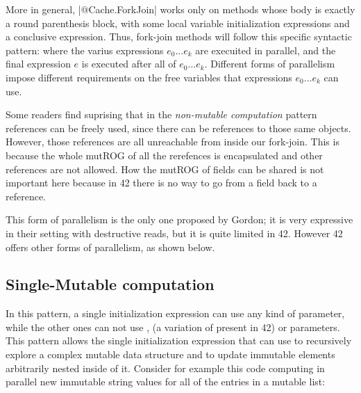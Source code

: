More in general, \Q|$@$Cache.ForkJoin| works only on methods whose body is exactly a round parenthesis block, with some local variable initialization expressions and a conclusive expression.
Thus, fork-join methods will follow this specific syntactic pattern:
where the varius expressions $e_0...e_k$ are execuited in parallel, and the final expression $e$ is executed after all of $e_0...e_k$.
Different forms of parallelism impose different requirements on the free variables that expressions $e_0...e_k$ can use.

Some readers find suprising that in the \emph{non-mutable computation} pattern \Q@read@ references can be freely used, since there can be \Q@mut@ references to those same objects.
However, those \Q@mut@ references are all unreachable from inside our fork-join. This is because the whole
mutROG of all the \Q@capsule@ rerefences is encapsulated and other \Q@mut@ references are not allowed.
How the mutROG of \Q@capsule@ fields can be shared is not important here because in 42 there is no way to go from a \Q@capsule@ field back to a \Q@capsule@ reference.

This form of parallelism is the only one proposed by Gordon; it is very expressive in their setting with destructive reads, but it is quite limited in 42. However 42 offers other forms of parallelism, as shown below.



\subsection*{Single-Mutable computation}
In this pattern, a single initialization expression can use any kind of parameter, while the other ones can not 
use \Q@mut@, \Q@lent@ (a variation of \Q@mut@ present in 42) or \Q@read@ parameters.
This pattern allows the single initialization expression that can use \Q@mut@ to recursively explore a complex mutable data structure and to update immutable elements arbitrarily nested inside of it.
Consider for example this code computing in parallel 
new immutable string values for all of
the entries in a mutable list:

